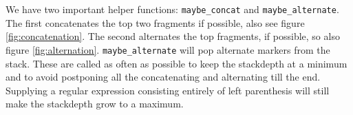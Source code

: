 
We have two important helper functions: \lstinline{maybe_concat} and
\lstinline{maybe_alternate}. The first concatenates the top two
fragments if possible, also see figure \vref{fig:concatenation}. The
second alternates the top fragments, if possible, so also figure
\vref{fig:alternation}. \lstinline{maybe_alternate} will pop alternate
markers from the stack. These are called as often as possible to keep
the stackdepth at a minimum and to avoid postponing all the
concatenating and alternating till the end. Supplying a regular
expression consisting entirely of left parenthesis will still make the
stackdepth grow to a maximum.


